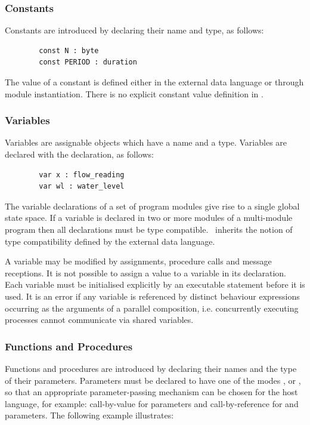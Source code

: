 \subsubsection{Constants}
Constants are introduced by declaring their name and type, as follows:
\begin{verbatim}
        const N : byte
        const PERIOD : duration
\end{verbatim}
The value of a constant is defined either in the external data language or 
through module instantiation. There is no explicit constant value definition
in \candle.

\subsubsection{Variables}
Variables are assignable objects which have a name and a type. Variables
are declared with the  declaration, as follows:
\begin{verbatim}
        var x : flow_reading
        var wl : water_level
\end{verbatim}
The variable declarations of a set of program modules give rise to a
single global state space. If a variable is declared
in two or more modules of a multi-module program then all declarations
must be type compatible. \candle\ inherits the notion of
type compatibility defined by the external
data language. 

A variable may be modified by assignments, procedure calls and message
receptions. It is not possible to assign a value to a variable in its
declaration. Each variable must be initialised explicitly by an 
executable statement before it is used. It is an error if any variable
is referenced by distinct behaviour expressions
occurring as the arguments of a parallel composition, i.e.
concurrently executing processes  cannot communicate via 
shared variables.

\subsubsection{Functions and Procedures}
Functions and procedures are introduced by declaring their names and
the type of their parameters. Parameters must be declared to have one
of the modes ,  or , so that an
appropriate parameter-passing mechanism can be chosen for the host
language, for example: call-by-value for  parameters and
call-by-reference for  and  parameters. The
following example illustrates:

